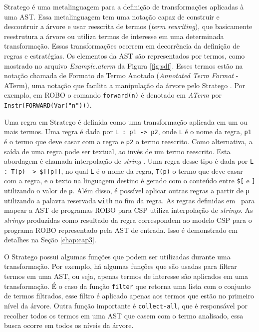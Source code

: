 Stratego é uma metalinguagem para a definição de transformações aplicadas à uma AST. Essa metalinguagem tem uma notação capaz de construir e descontruir a árvore e usar reescrita de termos (\textit{term rewriting}), que basicamente reestrutura a árvore ou utiliza termos de interesse em uma determinada transformação. Essas transformações ocorrem em decorrência da definição de regras e estratégias. Os elementos da AST são representados por termos, como mostrado no arquivo \textit{Example.aterm} da Figura \ref{fig:sdf}. Esses termos estão na notação chamada de Formato de Termo Anotado (\textit{Annotated Term Format} - ATerm), uma notação que facilita a manipulação da árvore pelo Stratego  \cite{metaborg}. Por exemplo, em ROBO o comando \texttt{forward(n)} é denotado em \textit{ATerm} por \texttt{Instr(FORWARD(Var("n")))}.

Uma regra em Stratego é definida como uma transformação aplicada em um ou mais termos. Uma regra é dada por \texttt{L : p1 -> p2}, onde \texttt{L} é o nome da regra, \texttt{p1} é o termo que deve casar com a regra e \texttt{p2} o termo reescrito. Como alternativa, a saída de uma regra pode ser textual, ao invés de um termo reescrito. Esta abordagem é chamada interpolação de \textit{string} \cite{KatsSpoofax}. Uma regra desse tipo é dada por \texttt{L : T(p) -> \$[[p]]}, no qual \texttt{L} é o nome da regra, \texttt{T(p)} o termo que deve casar com a regra, e o texto na linguagem destino é gerado com o conteúdo entre \texttt{\$[} e \texttt{]} utilizando o valor de \texttt{p}. Além disso, é possível aplicar outras regras a partir de \texttt{p} utilizando a palavra reservada \texttt{with} no fim da regra. As regras definidas em~\cite{nogueira} para mapear a AST de programas ROBO para CSP utiliza interpolação de \textit{strings}. As \textit{strings} produzidas como resultado da regra correspondem ao modelo CSP para o programa ROBO representado pela AST de entrada. Isso é demonstrado em detalhes na Seção \ref{chap:cap3}. 


O Stratego possui algumas funções que podem ser utilizadas durante uma transformação. Por exemplo, há algumas funções que são usadas para filtrar termos em uma AST, ou seja, apenas termos de interesse são aplicados em uma transformação. É o caso da função \texttt{filter} que retorna uma lista com o conjunto de termos filtrados, esse filtro é aplicado apenas aos termos que estão no primeiro nível da árvore. Outra função importante é \texttt{collect-all}, que é responsável por recolher todos os termos em uma AST que casem com o termo analisado, essa busca ocorre em todos os níveis da árvore.

